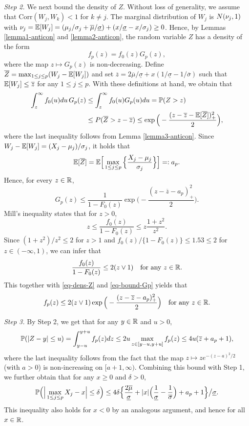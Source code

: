 \documentclass[a4paper,12pt]{article}
\begin{document}
\textit{Step 2.} We next bound the density of $Z$. Without loss of generality, we assume that $\text{Corr}(W_j,W_k) < 1$ for $k \ne j$. The marginal distribution of $W_j$ is $N(\nu_j,1)$ with $\nu_j = \mathbb{E}[W_j] = (\mu_j/\sigma_j + \overline{\mu}/{\underline{\sigma}}) + (x/\underline{\sigma} - x/\sigma_j) \ge 0$. Hence, by Lemmas \ref{lemma1-anticon} and \ref{lemma2-anticon}, the random variable $Z$ has a density of the form
\begin{equation}\label{eq-dens-Z}
f_p(z) = f_0(z) G_p(z), 
\end{equation}
where the map $z \mapsto G_p(z)$ is non-decreasing. Define $\overline{Z} = \max_{1 \le j \le p} (W_j - \mathbb{E}[W_j])$ and set $\overline{z} = 2 \overline{\mu}/\underline{\sigma} + x(1/\underline{\sigma} - 1/\overline{\sigma})$ such that $\mathbb{E}[W_j] \le \overline{z}$ for any $1 \le j \le p$. With these definitions at hand, we obtain that  
\begin{align*}
\int_z^{\infty} f_0(u)du \, G_p(z) & \le \int_z^{\infty} f_0(u) G_p(u) du = \mathbb{P}(Z > z) \\ 
 & \le P(\overline{Z} > z - \overline{z}) \le \exp \Big( - \frac{(z - \overline{z} - \mathbb{E}[\overline{Z}])^2_+}{2} \Big), 
\end{align*}
where the last inequality follows from Lemma \ref{lemma3-anticon}. Since $W_j - \mathbb{E}[W_j] = (X_j - \mu_j)/\sigma_j$, it holds that 
\[ \mathbb{E}[\overline{Z}] = \mathbb{E} \Big[ \max_{1 \le j \le p} \Big\{ \frac{X_j-\mu_j}{\sigma_j} \Big\} \Big] =: a_p. \]
Hence, for every $z \in \mathbb{R}$, 
\begin{equation}\label{eq-bound-Gp}
G_p(z) \le \frac{1}{1 - F_0(z)} \exp\Big( - \frac{(z - \overline{z} - a_p)_+^2}{2} \Big). 
\end{equation}
Mill's inequality states that for $z > 0$, 
\[ z \le \frac{f_0(z)}{1-F_0(z)} \le z \frac{1+z^2}{z^2}. \]
Since $(1+z^2)/z^2 \le 2$ for $z > 1$ and $f_0(z)/\{1-F_0(z)\} \le 1.53 \le 2$ for $z \in (-\infty,1)$, we can infer that
\[ \frac{f_0(z)}{1-F_0(z)} \le 2 (z \vee 1) \quad \text{for any } z \in \mathbb{R}. \]
This together with \eqref{eq-dens-Z} and \eqref{eq-bound-Gp} yields that
\[ f_p(z) \le 2 (z \vee 1)  \exp\Big( - \frac{(z - \overline{z} - a_p)_+^2}{2} \Big) \quad \text{for any } z \in \mathbb{R}. \]
 

\textit{Step 3.} By Step 2, we get that for any $y \in \mathbb{R}$ and $u > 0$, 
\[ \mathbb{P}( |Z - y| \le u) = \int_{y - u}^{y + u} f_p(z) dz \le 2u \max_{z \in [y-u,y+u]} f_p(z) \le 4u (\overline{z} + a_p + 1), \] 
where the last inequality follows from the fact that the map $z \mapsto z e^{-(z-a)^2/2}$ (with $a > 0$) is non-increasing on $[a+1,\infty)$. Combining this bound with Step 1, we further obtain that for any $x \ge 0$ and $\delta > 0$, 
\begin{equation}\label{eq-bound1-Levy}
\mathbb{P} \Big( \Big| \max_{1 \le j \le p} X_j - x \Big| \le \delta \Big) \le 4\delta \Big\{ \frac{2\overline{\mu}}{\underline{\sigma}} + |x| \Big(\frac{1}{\underline{\sigma}} - \frac{1}{\overline{\sigma}}\Big) + a_p + 1 \Big\} \big/ \underline{\sigma}. 
\end{equation} 
This inequality also holds for $x < 0$ by an analogous argument, and hence for all $x \in \mathbb{R}$. 
\end{document}
